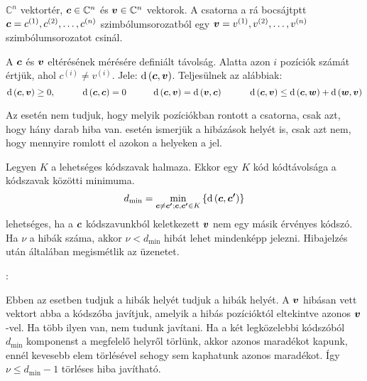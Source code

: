 \documentclass[main.tex]{subfiles}
\begin{document}
  $\mathbb{C}^n$ vektortér, $\vb*{c} \in \mathbb{C}^n$
  és $\vb*{v} \in \mathbb{C}^n$ vektorok. A csatorna a rá
  bocsájtptt $\vb*{c} = c^{(1)}, c^{(2)}, \dots, c^{(n)}$
  szimbólumsorozatból egy $\vb*{v} = v^{(1)}, v^{(2)},
  \dots, v^{(n)}$ szimbólumsorozatot csinál.

  A  $\vb*{c}$ és $\vb*{v}$
  eltérésének mérésére definiált távolság. Alatta
  azon $i$ pozíciók számát értjük, ahol
  $c^{(i)} \neq v^{(i)}$.
  Jele: $\mathrm{d}\left( \vb*{c}, \vb*{v} \right)$.
  Teljesülnek az alábbiak:
  \begin{equation*}
    \mathrm{d}\left( \vb*{c}, \vb*{v} \right) \geq 0,
    \hspace{3em}
    \mathrm{d}\left( \vb*{c}, \vb*{c} \right) = 0
    \hspace{3em}
    \mathrm{d}\left( \vb*{c}, \vb*{v} \right) =
    \mathrm{d}\left( \vb*{v}, \vb*{c} \right)
    \hspace{3em}
    \mathrm{d}\left( \vb*{c}, \vb*{v} \right) \leq
    \mathrm{d}\left( \vb*{c}, \vb*{w} \right) +
    \mathrm{d}\left( \vb*{w}, \vb*{v} \right) 
  \end{equation*}


  Az  esetén nem tudjuk,
  hogy melyik pozíciókban rontott a csatorna,
  csak azt, hogy hány darab hiba van.
   esetén ismerjük
  a hibázások helyét is, csak azt nem,
  hogy mennyire romlott el azokon a helyeken a jel.

  \vspace{.5em}
  Legyen $K$ a lehetséges kódszavak halmaza. Ekkor
  egy $K$ kód kódtávolsága a kódszavak közötti
   minimuma.
  \begin{equation*}
    d_\mathrm{{min}} = \min_{
      \vb*{c} \neq \vb*{c'};\vb*{c}, \vb*{c'} \in K
    } \left\{ \mathrm{d} \left( \vb*{c}, \vb*{c'} \right) \right\}
  \end{equation*}
   lehetséges, ha a $\vb*{c}$ kódszavunkból
  keletkezett $\vb*{v}$ nem egy másik érvényes kódszó. Ha $\nu$
  a hibák száma, akkor $\nu < d_\mathrm{min}$ hibát lehet mindenképp
  jelezni. Hibajelzés után általában megismétlik az üzenetet.

  \vspace*{1em}
  {\large {}:}
  \vspace{.5em}

  Ebben az esetben tudjuk a hibák helyét tudjuk a hibák helyét.
  A $\vb*{v}$ hibásan vett vektort abba a kódszóba javítjuk,
  amelyik a hibás pozícióktól eltekintve azonos $\vb*{v}$-vel.
  Ha több ilyen van, nem tudunk javítani.
  Ha a két legközelebbi kódszóból $d_\mathrm{min}$ komponenst
  a megfelelő helyről törlünk, akkor azonos maradékot kapunk,
  ennél kevesebb elem törlésével sehogy sem kaphatunk azonos
  maradékot. Így $\nu \leq d_\mathrm{min} - 1$ törléses hiba javítható.
\end{document}
